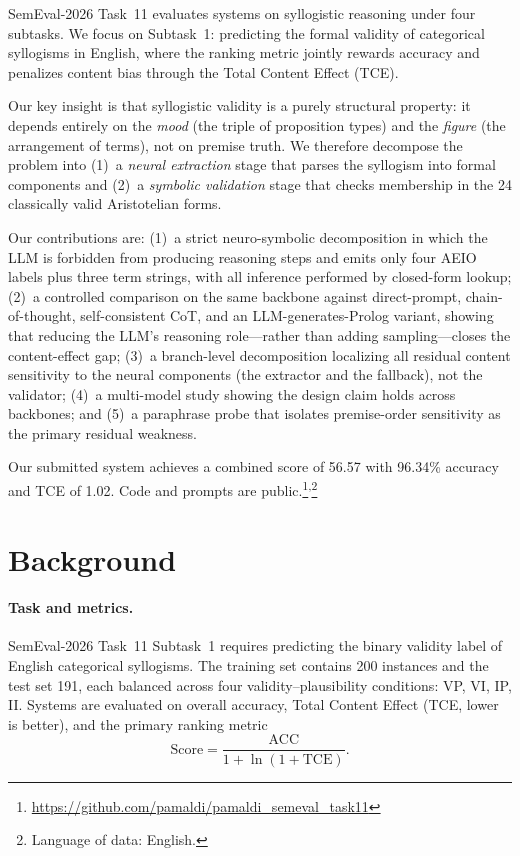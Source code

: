 \documentclass[11pt]{article}
\begin{document}
SemEval-2026 Task~11 \citep{valentino-etal-2026-semeval} evaluates systems on syllogistic reasoning under four subtasks. We focus on Subtask~1: predicting the formal validity of categorical syllogisms in English, where the ranking metric jointly rewards accuracy and penalizes content bias through the Total Content Effect (TCE).

Our key insight is that syllogistic validity is a purely structural property: it depends entirely on the \emph{mood} (the triple of proposition types) and the \emph{figure} (the arrangement of terms), not on premise truth. We therefore decompose the problem into (1)~a \emph{neural extraction} stage that parses the syllogism into formal components and (2)~a \emph{symbolic validation} stage that checks membership in the 24 classically valid Aristotelian forms.

Our contributions are: (1)~a strict neuro-symbolic decomposition in which the LLM is forbidden from producing reasoning steps and emits only four AEIO labels plus three term strings, with all inference performed by closed-form lookup; (2)~a controlled comparison on the same backbone against direct-prompt, chain-of-thought, self-consistent CoT, and an LLM-generates-Prolog variant, showing that reducing the LLM's reasoning role---rather than adding sampling---closes the content-effect gap; (3)~a branch-level decomposition localizing all residual content sensitivity to the neural components (the extractor and the fallback), not the validator; (4)~a multi-model study showing the design claim holds across backbones; and (5)~a paraphrase probe that isolates premise-order sensitivity as the primary residual weakness.

Our submitted system achieves a combined score of 56.57 with 96.34\% accuracy and TCE of 1.02. Code and prompts are public.\footnote{\url{https://github.com/pamaldi/pamaldi_semeval_task11}}\textsuperscript{,}\footnote{Language of data: English.}


\section{Background}

\paragraph{Task and metrics.} SemEval-2026 Task~11 Subtask~1 \citep{valentino-etal-2026-semeval} requires predicting the binary validity label of English categorical syllogisms. The training set contains 200 instances and the test set 191, each balanced across four validity--plausibility conditions: VP, VI, IP, II. Systems are evaluated on overall accuracy, Total Content Effect (TCE, lower is better), and the primary ranking metric
\[
\text{Score} = \frac{\text{ACC}}{1 + \ln(1 + \text{TCE})}.
\]
\end{document}
